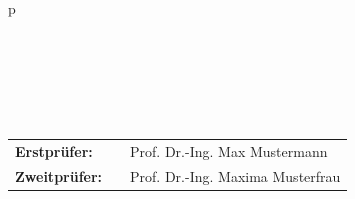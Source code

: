 \begin{center}
\begin{tabular}{p{\textwidth}}
\begin{center}
\large{\textbf{\myauthor}} \\
\end{center}

\begin{center}
\large{\mydate}
\end{center}

\\
\\
\\

\begin{center}
\begin{tabular}{lll}
\textbf{Erstprüfer:} & & Prof. Dr.-Ing. Max Mustermann\\
\textbf{Zweitprüfer:} & & Prof. Dr.-Ing. Maxima Musterfrau\\
\end{tabular}
\end{center}

\end{tabular}
\end{center}